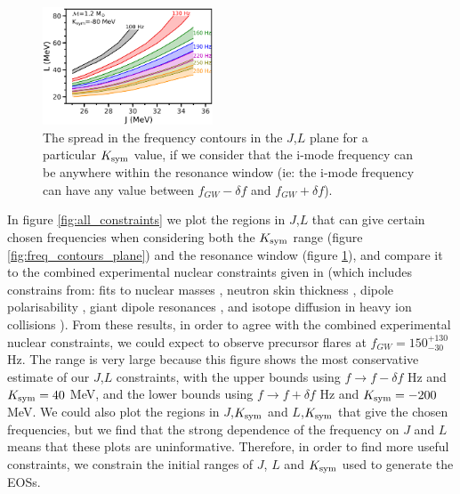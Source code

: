 \documentclass[fleqn,usenatbib]{mnras}
\begin{document}
\begin{figure}
\centering
\includegraphics[width=0.45\textwidth,angle=0]{JL_dfspread.png}
\caption{The spread in the frequency contours in the $J$,$L$ plane for a particular $K_{\rm sym}$ value, if we consider that the i-mode frequency can be anywhere within the resonance window (ie: the i-mode frequency can have any value between $f_{GW}-\delta f$ and $f_{GW}+\delta f$).}
\label{fig:t_res_spread}
\end{figure}


In figure \ref{fig:all_constraints} we plot the regions in $J$,$L$ that can give certain chosen frequencies when considering both the $K_{\rm sym}$ range (figure \ref{fig:freq_contours_plane}) and the resonance window (figure \ref{fig:t_res_spread}), and compare it to the combined experimental nuclear constraints given in \citet{lattimer2013constraining} (which includes constrains from: fits to nuclear masses \citep{kortelainen2010nuclear}, neutron skin thickness \citep{chen2010density}, dipole polarisability \citep{piekarewicz2012electric}, giant dipole resonances \citep{trippa2008giant}, and isotope diffusion in heavy ion collisions \citep{tsang2009constraints}). From these results, in order to agree with the combined experimental nuclear constraints, we could expect to observe precursor flares at $f_{GW}=150^{+130}_{-30}$ Hz. The range is very large because this figure shows the most conservative estimate of our $J$,$L$ constraints, with the upper bounds using $f\rightarrow f-\delta f$ Hz and $K_{\rm sym}=40$ MeV, and the lower bounds using $f\rightarrow f+\delta f$ Hz and $K_{\rm sym}=-200$ MeV. We could also plot the regions in $J$,$K_{\rm sym}$ and $L$,$K_{\rm sym}$ that give the chosen frequencies, but we find that the strong dependence of the frequency on $J$ and $L$ means that these plots are uninformative. Therefore, in order to find more useful constraints, we constrain the initial ranges of $J$, $L$ and $K_{\rm sym}$ used to generate the EOSs.
\end{document}
